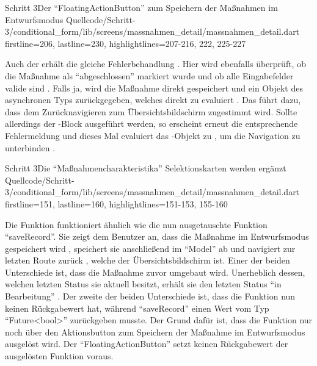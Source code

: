 \begin{alexlisting}{Schritt 3}{Der \enquote{FloatingActionButton} zum Speichern der Maßnahmen im Entwurfsmodus}
    {Quellcode/Schritt-3/conditional_form/lib/screens/massnahmen_detail/massnahmen_detail.dart}
    {firstline=206, lastline=230, highlightlines={207-216, 222, 225-227}}
    \label{lst:Schritt3FloatingActionButton}
\end{alexlisting} 

Auch der  erhält die gleiche Fehlerbehandlung \Lst{\ref{lst:Schritt3onWillPop}}.
Hier wird ebenfalls überprüft, ob die Maßnahme als \enquote{abgeschlossen} markiert wurde und ob alle Eingabefelder valide sind .
Falls ja, wird die Maßnahme direkt gespeichert und ein Objekt des asynchronen Typs  zurückgegeben, welches direkt zu  evaluiert .
Das führt dazu, dass dem Zurücknavigieren zum Übersichtsbildschirm zugestimmt wird.
Sollte allerdings der -Block ausgeführt werden, so erscheint erneut die entsprechende Fehlermeldung  und dieses Mal evaluiert das -Objekt zu , um die Navigation zu unterbinden .

\begin{alexlisting}{Schritt 3}{Die \enquote{Maßnahmencharakteristika} Selektionskarten werden ergänzt}
    {Quellcode/Schritt-3/conditional_form/lib/screens/massnahmen_detail/massnahmen_detail.dart}
    {firstline=151, lastline=160, highlightlines={151-153, 155-160}}
    \label{lst:Schritt3onWillPop}
\end{alexlisting}

Die Funktion  funktioniert ähnlich wie die nun ausgetauschte Funktion \enquote{saveRecord}.
Sie zeigt dem Benutzer an, dass die Maßnahme im Entwurfsmodus gespeichert wird , speichert sie anschließend im \enquote{Model} ab  und navigiert zur letzten Route zurück , welche der Übersichtsbildschirm ist.
Einer der beiden Unterschiede ist, dass die Maßnahme zuvor umgebaut wird.
Unerheblich dessen, welchen letzten Status sie aktuell besitzt, erhält sie den letzten Status \enquote{in Bearbeitung} .
Der zweite der beiden Unterschiede ist, dass die Funktion nun keinen Rückgabewert hat, während \enquote{saveRecord} einen Wert vom Typ \enquote{Future<bool>} zurückgeben musste.
Der Grund dafür ist, dass die Funktion nur noch über den Aktionsbutton zum Speichern der Maßnahme im Entwurfsmodus ausgelöst wird. Der \enquote{FloatingActionButton} setzt keinen Rückgabewert der ausgelösten Funktion voraus.

